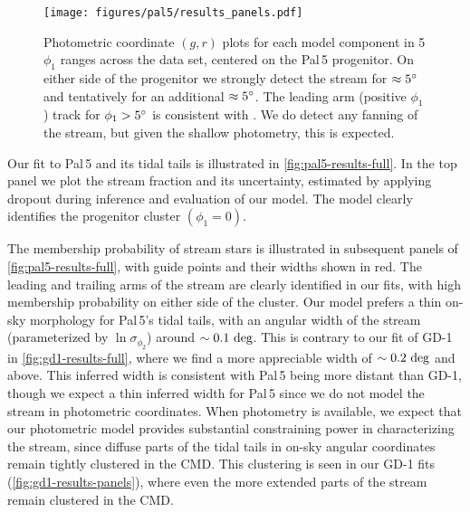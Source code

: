 \documentclass[twocolumn]{aastex631}
\newcommand{\stream}[1]{#1}
\begin{document}
        \begin{figure*}[htp]
            \centering
            \texttt{[image: figures/pal5/results\_panels.pdf]}
            \caption{%
                Photometric coordinate $(g, r)$ plots for each model component
                in 5 $\phi_1$ ranges across the data set, centered on the
                \stream{Pal\,5} progenitor.
                On either side of the progenitor we strongly detect the stream
                for $\approx 5\degree$  and tentatively for an additional
                $\approx 5\degree$. The leading arm (positive $\phi_1$) track
                for $\phi_1 > 5\degree$ is consistent with
                \citet{Starkman+2019}. We do detect any fanning of the stream,
                but given the shallow photometry, this is expected.
            }
            \label{fig:pal5-results-panels}
        \end{figure*}

    
        Our fit to \stream{Pal\,5} and its tidal tails is illustrated in
        \autoref{fig:pal5-results-full}. In the top panel we plot the stream
        fraction and its uncertainty, estimated by applying dropout during
        inference and evaluation of our model. The model clearly identifies the
        progenitor cluster $(\phi_1 = 0)$. 
    
        The membership probability of stream stars is illustrated in subsequent
        panels of \autoref{fig:pal5-results-full}, with guide points and their
        widths shown in red. The leading and trailing arms of the stream are
        clearly identified in our fits, with high membership probability on
        either side of the cluster. Our model prefers a thin on-sky morphology
        for \stream{Pal\,5}'s tidal tails, with an angular width of the stream
        (parameterized by $\ln{\sigma_{\phi_2}}$) around $\sim 0.1~\rm{deg}$.
        This is contrary to our fit of \stream{GD-1} in
        \autoref{fig:gd1-results-full}, where we find a more appreciable width
        of $\sim 0.2~\rm{deg}$ and above.  This inferred width is consistent
        with \stream{Pal\,5} being more distant than \stream{GD-1}, though we
        expect a thin inferred width for \stream{Pal\,5} since we do not model
        the stream in photometric coordinates. When photometry is available, we
        expect that our photometric model provides substantial constraining
        power in characterizing the stream, since diffuse parts of the tidal
        tails in on-sky angular coordinates remain tightly clustered in the CMD.
        This clustering is seen in our \stream{GD-1} fits
        (\autoref{fig:gd1-results-panels}), where even the more extended parts
        of the stream remain clustered in the CMD.
        
\end{document}
